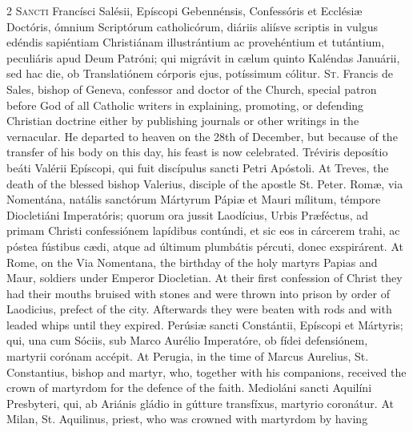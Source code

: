 \begin{paracol}{2}
\lettrine[lines=2]{S}{ancti} Francísci Salésii, Epíscopi Gebennénsis, Confessóris et Ecclésiæ 
 Doctóris, ómnium Scriptórum catholicórum, diáriis aliísve scriptis in vulgus 
 edéndis sapiéntiam Christiánam illustrántium ac provehéntium et tutántium, 
 peculiáris apud Deum Patróni; qui migrávit in cælum quinto Kaléndas Januárii, 
 sed hac die, ob Translatiónem córporis ejus, potíssimum cólitur.
\switchcolumn
{}
\lettrine[lines=2]{S}{t.} Francis de Sales, bishop of Geneva, confessor and doctor of the Church, 
 special patron before God of all Catholic writers in explaining, promoting, 
 or defending Christian doctrine either by publishing journals or other 
 writings in the vernacular. He departed to heaven on the 28th of 
 December, but because of the transfer of his body on this day, his feast is 
 now celebrated.
\switchcolumn*
{}
Tréviris deposítio beáti Valérii Epíscopi, qui fuit discípulus sancti Petri 
 Apóstoli.
\switchcolumn
{}
At Treves, the death of the blessed bishop Valerius, disciple of the apostle 
 St. Peter.
\switchcolumn*
{}
Romæ, via Nomentána, natális sanctórum Mártyrum 
 Pápiæ et Mauri mílitum, témpore Diocletiáni Imperatóris; quorum ora jussit 
 Laodícius, Urbis Præféctus, ad primam Christi confessiónem lapídibus 
 contúndi, et sic eos in cárcerem trahi, ac póstea fústibus cædi, atque ad 
 últimum plumbátis pércuti, donec exspirárent.
\switchcolumn
{}
At Rome, on the Via Nomentana, the birthday of the holy martyrs Papias and 
 Maur, soldiers under Emperor Diocletian. At their first confession of 
 Christ they had their mouths bruised with stones and were thrown into prison 
 by order of Laodicius, prefect of the city. Afterwards they were 
 beaten with rods and with leaded whips until they expired.
\switchcolumn*
{}
Perúsiæ sancti Constántii, Epíscopi et Mártyris; 
 qui, una cum Sóciis, sub Marco Aurélio Imperatóre, ob fídei defensiónem, 
 martyrii corónam accépit.
\switchcolumn
{}
At Perugia, in the time of Marcus Aurelius, St. Constantius, bishop and 
 martyr, who, together with his companions, received the crown of martyrdom 
 for the defence of the faith.
\switchcolumn*
{}
Medioláni sancti Aquilíni Presbyteri, qui, ab Ariánis gládio in gútture 
 transfíxus, martyrio coronátur.
\switchcolumn
{}
At Milan, St. Aquilinus, priest, who was crowned with martyrdom by having 

\end{paracol}
